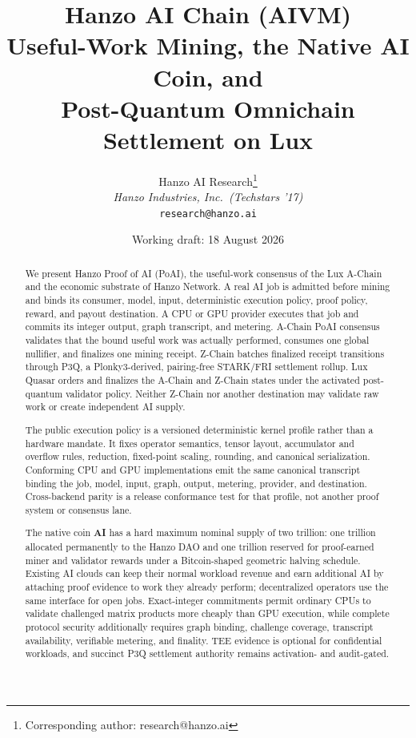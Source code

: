 \documentclass[11pt,a4paper]{article}
\title{Hanzo AI Chain (AIVM)\\[4pt]
\large Useful-Work Mining, the Native AI Coin, and\\
Post-Quantum Omnichain Settlement on Lux}
\author{
Hanzo AI Research\thanks{Corresponding author: research@hanzo.ai}\\
\textit{Hanzo Industries, Inc.\ (Techstars '17)}\\
\texttt{research@hanzo.ai}
}
\date{Working draft: 18 August 2026}
\begin{document}
\hanzocoverpage

\begin{abstract}
We present Hanzo Proof of AI (PoAI), the useful-work consensus of the Lux
A-Chain and the economic substrate of Hanzo Network. A real AI job is admitted
before mining and binds its consumer, model, input, deterministic execution
policy, proof policy, reward, and payout destination. A CPU or GPU provider
executes that job and commits its integer output, graph transcript, and
metering. A-Chain PoAI consensus validates that the bound useful work was
actually performed, consumes one global nullifier, and finalizes one mining
receipt. Z-Chain batches finalized receipt transitions through P3Q, a
Plonky3-derived, pairing-free STARK/FRI settlement rollup. Lux Quasar orders and
finalizes the A-Chain and Z-Chain states under the activated post-quantum
validator policy. Neither Z-Chain nor another destination may validate raw work
or create independent AI supply.

The public execution policy is a versioned deterministic kernel profile rather
than a hardware mandate. It fixes operator semantics, tensor layout, accumulator
and overflow rules, reduction, fixed-point scaling, rounding, and canonical
serialization. Conforming CPU and GPU implementations emit the same canonical
transcript binding the job, model, input, graph, output, metering, provider, and
destination. Cross-backend parity is a release conformance test for that profile,
not another proof system or consensus lane.

The native coin \textbf{AI} has a hard maximum nominal supply of two trillion:
one trillion allocated permanently to the Hanzo DAO and one trillion reserved
for proof-earned miner and validator rewards under a Bitcoin-shaped geometric
halving schedule. Existing AI clouds can keep their normal workload revenue and
earn additional AI by attaching proof evidence to work they already perform;
decentralized operators use the same interface for open jobs. Exact-integer
commitments permit ordinary CPUs to validate challenged matrix products more
cheaply than GPU execution, while complete protocol security additionally
requires graph binding, challenge coverage, transcript availability, verifiable
metering, and finality. TEE evidence is optional for confidential workloads,
and succinct P3Q settlement authority remains activation- and audit-gated.
\end{abstract}

\tableofcontents
\newpage













\end{document}
